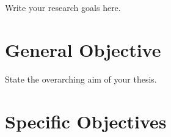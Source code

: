 

Write your research goals here.

\section{General Objective}

State the overarching aim of your thesis.

\section{Specific Objectives}


